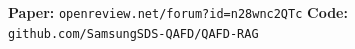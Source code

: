 \documentclass[final]{beamer}
\newlength{\sepwid}
\newlength{\colC}\setlength{\colC}{0.26\paperwidth}   %
\begin{document}
\begin{frame}[t]
\begin{columns}[t]
\begin{column}{\colC}
\vspace{0.3em}
\begin{center}
  \colorbox{samsunglight}{\parbox{0.95\linewidth}{\centering\small
  \textbf{Paper:} \texttt{openreview.net/forum?id=n28wnc2QTc}
  \hspace{1.5em}
  \textbf{Code:} \texttt{github.com/SamsungSDS-QAFD/QAFD-RAG}}}
\end{center}

\end{column}

\begin{column}{\sepwid}\end{column}

\end{columns}

\end{frame}
\end{document}
